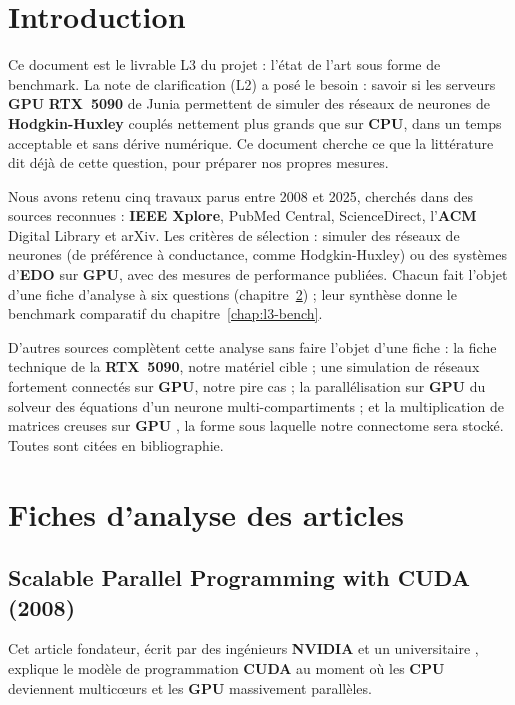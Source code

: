 \chapter{Introduction}

Ce document est le livrable L3 du projet : l'état de l'art sous forme de benchmark. La note de clarification (L2) a posé le besoin : savoir si les serveurs \textbf{GPU} \textbf{RTX~5090} de Junia permettent de simuler des réseaux de neurones de \textbf{Hodgkin-Huxley} couplés nettement plus grands que sur \textbf{CPU}, dans un temps acceptable et sans dérive numérique. Ce document cherche ce que la littérature dit déjà de cette question, pour préparer nos propres mesures.

Nous avons retenu cinq travaux parus entre 2008 et 2025, cherchés dans des sources reconnues : \textbf{IEEE Xplore}, PubMed Central, ScienceDirect, l'\textbf{ACM} Digital Library et arXiv. Les critères de sélection : simuler des réseaux de neurones (de préférence à conductance, comme Hodgkin-Huxley) ou des systèmes d'\textbf{EDO} sur \textbf{GPU}, avec des mesures de performance publiées. Chacun fait l'objet d'une fiche d'analyse à six questions (chapitre~\ref{chap:l3-fiches}) ; leur synthèse donne le benchmark comparatif du chapitre~\ref{chap:l3-bench}.

D'autres sources complètent cette analyse sans faire l'objet d'une fiche : la fiche technique de la \textbf{RTX~5090}, notre matériel cible \cite{techpowerup} ; une simulation de réseaux fortement connectés sur \textbf{GPU}, notre pire cas \cite{golosio2021} ; la parallélisation sur \textbf{GPU} du solveur des équations d'un neurone multi-compartiments \cite{vooturi2018} ; et la multiplication de matrices creuses sur \textbf{GPU} \cite{bell2009}, la forme sous laquelle notre connectome sera stocké. Toutes sont citées en bibliographie.

\chapter{Fiches d'analyse des articles}
\label{chap:l3-fiches}

\section{Scalable Parallel Programming with CUDA (2008)}

Cet article fondateur, écrit par des ingénieurs \textbf{NVIDIA} et un universitaire \cite{nickolls2008}, explique le modèle de programmation \textbf{CUDA} au moment où les \textbf{CPU} deviennent multicœurs et les \textbf{GPU} massivement parallèles.

